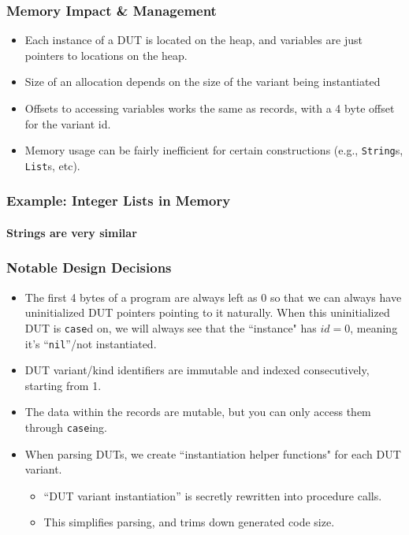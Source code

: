 \documentclass{beamer}
\begin{document}
\begin{frame}
\frametitle{Memory Impact \& Management}
\begin{itemize}
 \item<1-> Each instance of a DUT is located on the heap, and variables are just pointers to locations on the heap.
 \item<2-> Size of an allocation depends on the size of the variant being instantiated
 \item<3-> Offsets to accessing variables works the same as records, with a 4 byte offset for the variant id.
 \item<4-> Memory usage can be fairly inefficient for certain constructions (e.g., \texttt{String}s, \texttt{List}s, etc).
\end{itemize}

\begin{figure}
  
\end{figure}
\end{frame}

\begin{frame}
\frametitle{Example: Integer Lists in Memory}
\framesubtitle{Strings are very similar}
\begin{figure}
  
\end{figure}
\end{frame}


\begin{frame}
\frametitle{Notable Design Decisions}

\begin{itemize}
 \item<1-> The first 4 bytes of a program are always left as 0 so that we can always have uninitialized DUT pointers pointing to it naturally. When this uninitialized DUT is \texttt{case}d on, we will always see that the ``instance" has $id = 0$, meaning it's ``\texttt{nil}''/not instantiated.
 \item<2-> DUT variant/kind identifiers are immutable and indexed consecutively, starting from 1.
 \item<3-> The data within the records are mutable, but you can only access them through \texttt{case}ing.
 \item<4-> When parsing DUTs, we create ``instantiation helper functions" for each DUT variant. 
 \begin{itemize}
  \item<5-> ``DUT variant instantiation'' is secretly rewritten into procedure calls.
  \item<6-> This simplifies parsing, and trims down generated code size.
 \end{itemize}
\end{itemize}
\end{frame}
\end{document}
